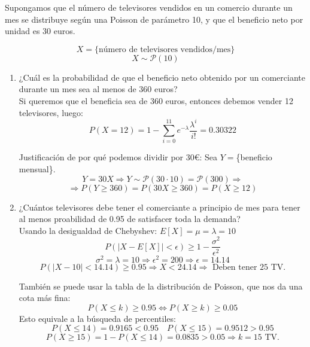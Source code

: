 \begin{ejer}
Supongamos que el número de televisores vendidos en un comercio durante un mes se distribuye según una Poisson de parámetro 10, y que el beneficio neto por unidad es 30 euros.

\end{ejer}
\begin{sol}
\[
X = \{\text{número de televisores vendidos/mes}\}
\]
\[
X \sim \mathcal{P}(10)
\]
\begin{enumerate}
\item ¿Cuál es la probabilidad de que el beneficio neto obtenido por un comerciante durante un mes sea al menos de 360 euros? \\

Si queremos que el beneficia sea de 360 euros, entonces debemos vender 12 televisores, luego:
\[
P(X=12)=1-\sum_{i=0}^{11}e^{-\lambda}\frac{\lambda^i}{i!}=0.30322
\]

\begin{nota}
Justificación de por qué podemos dividir por 30\euro: Sea $Y=$\{beneficio mensual\}.
\[
Y=30X \Longrightarrow Y \sim \mathcal{P}(30\cdot 10)=\mathcal{P}(300)\Longrightarrow 
\]
\[
\Longrightarrow P(Y\geq 360)=P(30X\geq 360)=P(X\geq 12)
\]
\end{nota}

\item ¿Cuántos televisores debe tener el comerciante a principio de mes para tener al menos proabilidad de 0.95 de satisfacer toda la demanda?\\

Usando la desigualdad de Chebyshev: $E[X]=\mu=\lambda=10$
\[
P(|X-E[X]|< \epsilon) \geq 1 - \frac{\sigma^2}{\epsilon^2}
\]
\[
\sigma^2=\lambda=10 \Longrightarrow \epsilon^2=200 \Longrightarrow \epsilon = 14.14
\]
\[P(|X-10|< 14.14) \geq 0.95 \Longrightarrow X < 24.14 \Longrightarrow \text{ Deben tener 25 TV.}\]

\begin{nota}
También se puede usar la tabla de la distribución de Poisson, que nos da una cota más fina:
\[
P(X\leq k) \geq 0.95 \Longleftrightarrow P(X \geq k) \geq 0.05
\]
Esto equivale a la búsqueda de percentiles:
\[
P(X\leq 14) = 0.9165 < 0.95 \quad P(X\leq 15) = 0.9512 > 0.95
\]
\[
P(X\geq 15)=1-P(X\leq 14)=0.0835 > 0.05 \Longrightarrow k=15 \text{ TV.}
\]
\end{nota}

\end{enumerate}

\end{sol}
